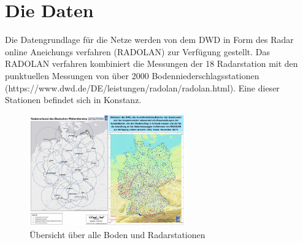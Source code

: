 \section{Die Daten}\label{die daten}
\begin{sloppypar}
    Die Datengrundlage für die Netze werden von dem DWD in Form des Radar online Aneichungs verfahren (RADOLAN) zur Verfügung gestellt. 
    Das RADOLAN verfahren kombiniert die Messungen der 18 Radarstation mit den punktuellen Messungen von über 2000 Bodenniederschlagsstationen (https://www.dwd.de/DE/leistungen/radolan/radolan.html). 
    Eine dieser Stationen befindet sich in Konstanz.
\end{sloppypar}

\begin{figure}[htb]
 \centering
 \includegraphics[width=0.6\textwidth,angle=0]{abb/daten_stationsuebersicht}
 \caption[Stationen Übersicht]{Übersicht über alle Boden und Radarstationen}
\label{fig:daten_stationsuebersicht}
\end{figure}

